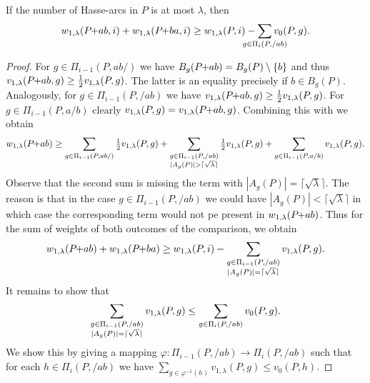 \documentclass[a4paper,UKenglish,cleveref, autoref, thm-restate]{lipics-v2021}
\newcommand{\pchild}[3]{{#1}\kern-1pt{+}{#2}{#3}}
\begin{document}
\begin{lemma}
  If the number of Hasse-arcs in $P$ is at most $\lambda$, then
  \begin{equation*}
    w_{1,\lambda}(\pchild{P}{a}{b}, i) + w_{1,\lambda}(\pchild{P}{b}{a}, i) \ge w_{1,\lambda} (P, i) - \sum_{\mathclap{g \in \Pi_i(P,/ab)}} v_0(P, g)\text. 
  \end{equation*}
\end{lemma}

\begin{proof}
  For $g \in \Pi_{i-1}(P,ab/)$ we have $B_g(\pchild{P}{a}{b}) = B_g(P) \setminus \{ b \}$ and thus $v_{1,\lambda}(\pchild{P}{a}{b}, g) \ge \tfrac12 v_{1,\lambda}(P, g)$.
  The latter is an equality precisely if $b \in B_g(P)$.
  Analogously, for $g \in \Pi_{i-1}(P,/ab)$ we have $v_{1,\lambda}(\pchild{P}{a}{b}, g) \ge \tfrac12 v_{1,\lambda}(P, g)$.
  For $g \in \Pi_{i-1}(P, a/b)$ clearly $v_{1,\lambda}(P, g) = v_{1,\lambda}(\pchild{P}{a}{b}, g)$.
  Combining this with  we obtain
  \begin{equation*}
    w_{1,\lambda}(\pchild{P}{a}{b}) \ge \sum_{g \in \Pi_{i-1}(P,ab/)} \tfrac12 v_{1,\lambda}(P,g) + \sum_{\substack{g \in \Pi_{i-1}(P,/ab)\\|A_g(P)| > \lceil\sqrt\lambda\rceil}} \tfrac12 v_{1,\lambda}(P, g) + \sum_{g \in \Pi_{i-1}(P,a/b)} v_{1,\lambda}(P, g)\text.
  \end{equation*}
  Observe that the second sum is missing the term with $|A_g(P)| = \lceil\sqrt\lambda\rceil$.
  The reason is that in the case $g \in \Pi_{i-1}(P,/ab)$ we could have $|A_g(P)| < \lceil\sqrt\lambda\rceil$ in which case the corresponding term would not pe present in $w_{1,\lambda}(\pchild{P}{a}{b})$.
  Thus for the sum of weights of both outcomes of the comparison, we obtain
  \begin{equation*}
    w_{1,\lambda}(\pchild{P}{a}{b}) + w_{1,\lambda}(\pchild{P}{b}{a}) \ge w_{1,\lambda} (P, i) - \sum_{\substack{g \in \Pi_{i-1}(P,/ab)\\|A_g(P)| = \lceil\sqrt\lambda\rceil}} v_{1,\lambda}(P, g)\text.
  \end{equation*}
  It remains to show that
  \begin{equation}\label{eq:ineq_sums}
  \sum_{\substack{g \in \Pi_{i-1}(P,/ab)\\|A_g(P)| = \lceil\sqrt\lambda\rceil}} v_{1,\lambda}(P, g) \le \sum_{g \in \Pi_i(P, /ab)} v_0(P, g)\text.
  \end{equation}
  We show this by giving a mapping $\varphi \colon \Pi_{i-1}(P,/ab) \to \Pi_i(P, /ab)$ such that for each $h \in \Pi_i(P, /ab)$ we have $\sum_{g \in \varphi^{-1}(h)} v_{1,\lambda}(P, g) \le v_0(P, h)$.

\end{proof}
\end{document}
